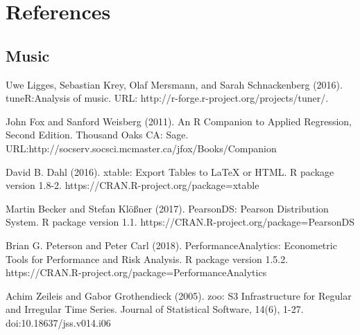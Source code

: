 \section{References}

\subsection{Music}

Uwe Ligges, Sebastian Krey, Olaf Mersmann, and Sarah Schnackenberg (2016). 
\newblock tuneR:Analysis of music. 
\newblock URL: http://r-forge.r-project.org/projects/tuner/.

John Fox and Sanford Weisberg (2011). 
\newblock An {R} Companion to Applied Regression, 
\newblock Second Edition. Thousand Oaks CA: Sage. URL:http://socserv.socsci.mcmaster.ca/jfox/Books/Companion

David B. Dahl (2016). 
\newblock xtable: Export Tables to LaTeX or HTML. 
\newblock R package version 1.8-2. https://CRAN.R-project.org/package=xtable

Martin Becker and Stefan Klößner (2017). 
\newblock PearsonDS: Pearson Distribution System. 
\newblock R package version 1.1. https://CRAN.R-project.org/package=PearsonDS

Brian G. Peterson and Peter Carl (2018). PerformanceAnalytics: Econometric Tools for
\newblock Performance and Risk Analysis. R package version 1.5.2.
\newblock https://CRAN.R-project.org/package=PerformanceAnalytics

 Achim Zeileis and Gabor Grothendieck (2005). 
\newblock zoo: S3 Infrastructure for Regular and Irregular Time Series. 
\newblock Journal of Statistical Software, 14(6), 1-27. doi:10.18637/jss.v014.i06

